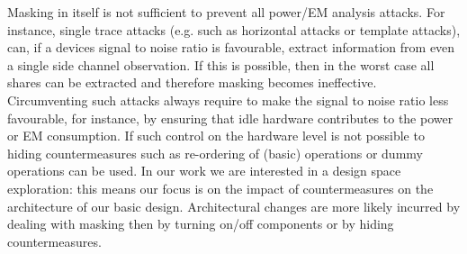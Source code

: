 Masking in itself is not sufficient to prevent all power/EM analysis attacks. For instance, single trace attacks (e.g. such as horizontal attacks or template attacks), can, if a devices signal to noise ratio is favourable, extract information from even a single side channel observation. If this is possible, then in the worst case all shares can be extracted and therefore masking becomes ineffective. Circumventing such attacks always require to make the signal to noise ratio less favourable, for instance, by ensuring that idle hardware contributes to the power or EM consumption. If such control on the hardware level is not possible to hiding countermeasures such as re-ordering of (basic) operations or dummy operations can be used. In our work we are interested in a design space exploration: this means our focus is on the impact of countermeasures on the architecture of our basic design. Architectural changes are more likely incurred by dealing with masking then by turning on/off components or by hiding countermeasures.
